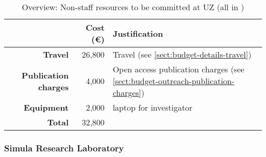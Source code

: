 \bigskip
\begin{table}[H]
\begin{tabular}{|r|r|p{9cm}|}
\hline
\textbf{} & \textbf{Cost (\euro)} & \textbf{Justification} \\\hline
\textbf{Travel} & 26,800 & Travel (see \ref{sect:budget-details-travel})\\\hline
\textbf{Publication charges} & 4,000 & Open access publication charges (see \ref{sect:budget-outreach-publication-charges})\\\hline
\textbf{Equipment} & 2,000 &  laptop for investigator \\\hline    %

\textbf{Total} & 32,800\\\cline{1-2}
\end{tabular}
\caption{Overview: Non-staff resources to be committed at UZ (all in \texteuro)}\vspace*{-1em}
\end{table}




\subsubsection{Simula Research Laboratory}

